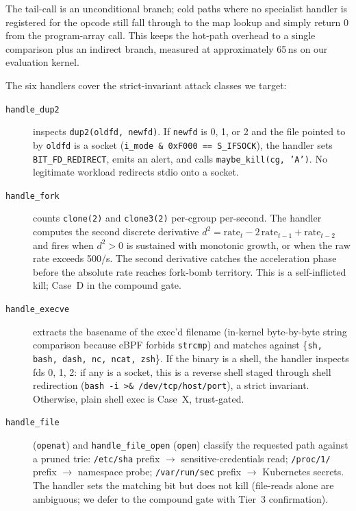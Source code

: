 The tail-call is an unconditional branch; cold paths where no specialist
handler is registered for the opcode still fall through to the map lookup
and simply return 0 from the program-array call. This keeps the hot-path
overhead to a single comparison plus an indirect branch, measured at
approximately 65\,ns on our evaluation kernel.

The six handlers cover the strict-invariant attack classes we target:

\begin{description}
  \item[\texttt{handle\_dup2}] inspects \texttt{dup2(oldfd, newfd)}. If
    \texttt{newfd} is 0, 1, or 2 and the file pointed to by \texttt{oldfd}
    is a socket (\texttt{i\_mode \& 0xF000 == S\_IFSOCK}), the handler
    sets \texttt{BIT\_FD\_REDIRECT}, emits an alert, and calls
    \texttt{maybe\_kill(cg, 'A')}. No legitimate workload redirects stdio
    onto a socket.

  \item[\texttt{handle\_fork}] counts \texttt{clone(2)} and
    \texttt{clone3(2)} per-cgroup per-second. The handler computes the
    second discrete derivative $d^2 = \text{rate}_t - 2\,\text{rate}_{t-1}
    + \text{rate}_{t-2}$ and fires when $d^2 > 0$ is sustained with
    monotonic growth, or when the raw rate exceeds 500/s. The second
    derivative catches the acceleration phase before the absolute rate
    reaches fork-bomb territory. This is a self-inflicted kill; Case~D in
    the compound gate.

  \item[\texttt{handle\_execve}] extracts the basename of the exec'd
    filename (in-kernel byte-by-byte string comparison because eBPF
    forbids \texttt{strcmp}) and matches against \{\texttt{sh, bash,
    dash, nc, ncat, zsh}\}. If the binary is a shell, the handler
    inspects fds 0, 1, 2: if any is a socket, this is a reverse shell
    staged through shell redirection (\texttt{bash -i >\&
    /dev/tcp/host/port}), a strict invariant. Otherwise, plain shell
    exec is Case~X, trust-gated.

  \item[\texttt{handle\_file}] (\texttt{openat}) and \texttt{handle\_file\_open}
    (\texttt{open}) classify the requested path against a pruned trie:
    \texttt{/etc/sha} prefix $\to$ sensitive-credentials read;
    \texttt{/proc/1/} prefix $\to$ namespace probe; \texttt{/var/run/sec}
    prefix $\to$ Kubernetes secrets. The handler sets the matching bit
    but does not kill (file-reads alone are ambiguous; we defer to the
    compound gate with Tier~3 confirmation).


\end{description}
